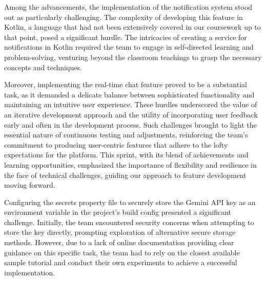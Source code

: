 Among the advancements, the implementation of the notification system stood out as particularly challenging. The complexity of developing this feature in Kotlin, a language that had not been extensively covered in our coursework up to that point, posed a significant hurdle. The intricacies of creating a service for notifications in Kotlin required the team to engage in self-directed learning and problem-solving, venturing beyond the classroom teachings to grasp the necessary concepts and techniques.

Moreover, implementing the real-time chat feature proved to be a substantial task, as it demanded a delicate balance between sophisticated functionality and maintaining an intuitive user experience. These hurdles underscored the value of an iterative development approach and the utility of incorporating user feedback early and often in the development process. Such challenges brought to light the essential nature of continuous testing and adjustments, reinforcing the team's commitment to producing user-centric features that adhere to the lofty expectations for the platform. This sprint, with its blend of achievements and learning opportunities, emphasized the importance of flexibility and resilience in the face of technical challenges, guiding our approach to feature development moving forward.

Configuring the secrets property file to securely store the Gemini API key as an environment variable in the project's build config presented a significant challenge. Initially, the team encountered security concerns when attempting to store the key directly, prompting exploration of alternative secure storage methods. However, due to a lack of online documentation providing clear guidance on this specific task, the team had to rely on the closest available sample tutorial and conduct their own experiments to achieve a successful implementation.

